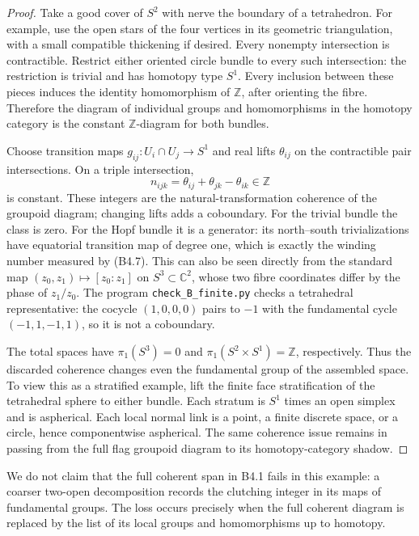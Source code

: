 \begin{proof}
Take a good cover of $S^2$ with nerve the boundary of a tetrahedron.
For example, use the open stars of the four vertices in its
geometric triangulation, with a small compatible thickening if
desired. Every nonempty intersection is contractible. Restrict
either oriented circle bundle to every such intersection: the
restriction is trivial and has homotopy type $S^1$. Every inclusion
between these pieces induces the identity homomorphism of
$\mathbb Z$, after orienting the fibre. Therefore the diagram
of individual groups and homomorphisms in the homotopy category
is the constant $\mathbb Z$-diagram for both bundles.

Choose transition maps $g_{ij}:U_i\cap U_j\to S^1$ and real lifts
$\theta_{ij}$ on the contractible pair intersections. On a triple
intersection,
\[
 n_{ijk}=\theta_{ij}+\theta_{jk}-\theta_{ik}\in\mathbb Z
 \tag{B4.7}
\]
is constant. These integers are the natural-transformation
coherence of the groupoid diagram; changing lifts adds a
coboundary. For the trivial bundle the class is zero. For the
Hopf bundle it is a generator: its north--south trivializations
have equatorial transition map of degree one, which is exactly
the winding number measured by (B4.7). This can also be seen
directly from the standard map $(z_0,z_1)\mapsto[z_0:z_1]$
on $S^3\subset\mathbb C^2$, whose two fibre coordinates differ
by the phase of $z_1/z_0$. The program
\texttt{check\_B\_finite.py} checks a tetrahedral representative:
the cocycle $(1,0,0,0)$ pairs to $-1$ with the fundamental cycle
$(-1,1,-1,1)$, so it is not a coboundary.

The total spaces have $\pi_1(S^3)=0$ and
$\pi_1(S^2\times S^1)=\mathbb Z$, respectively. Thus the
discarded coherence changes even the fundamental group of the
assembled space. To view this as a stratified example, lift the
finite face stratification of the tetrahedral sphere to either
bundle. Each stratum is $S^1$ times an open simplex and is
aspherical. Each local normal link is a point, a finite discrete
space, or a circle, hence componentwise aspherical. The same
coherence issue remains in passing from the full flag groupoid
diagram to its homotopy-category shadow.
\end{proof}

We do not claim that the full coherent span in B4.1 fails in this
example: a coarser two-open decomposition records the clutching
integer in its maps of fundamental groups. The loss occurs
precisely when the full coherent diagram is replaced by the list
of its local groups and homomorphisms up to homotopy.
